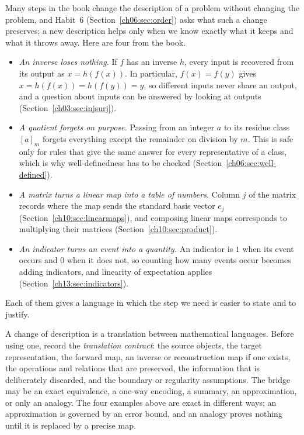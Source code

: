 Many steps in the book change the description of a problem without changing the problem, and Habit~6 (Section~\ref{ch06:sec:order}) asks what such a change preserves; a new description helps only when we know exactly what it keeps and what it throws away. Here are four from the book.
\begin{itemize}
\item \emph{An inverse loses nothing.} If $f$ has an inverse $h$, every input is recovered from its output as $x=h(f(x))$. In particular, $f(x)=f(y)$ gives $x=h(f(x))=h(f(y))=y$, so different inputs never share an output, and a question about inputs can be answered by looking at outputs (Section~\ref{ch03:sec:injsurj}).
\item \emph{A quotient forgets on purpose.} Passing from an integer $a$ to its residue class $[a]_m$ forgets everything except the remainder on division by $m$. This is safe only for rules that give the same answer for every representative of a class, which is why well-definedness has to be checked (Section~\ref{ch06:sec:well-defined}).
\item \emph{A matrix turns a linear map into a table of numbers.} Column $j$ of the matrix records where the map sends the standard basis vector $e_j$ (Section~\ref{ch10:sec:linearmaps}), and composing linear maps corresponds to multiplying their matrices (Section~\ref{ch10:sec:product}).
\item \emph{An indicator turns an event into a quantity.} An indicator is $1$ when its event occurs and $0$ when it does not, so counting how many events occur becomes adding indicators, and linearity of expectation applies (Section~\ref{ch13:sec:indicators}).
\end{itemize}
Each of them gives a language in which the step we need is easier to state and to justify.

A change of description is a translation between mathematical languages. Before using one, record the \emph{translation contract}: the source objects, the target representation, the forward map, an inverse or reconstruction map if one exists, the operations and relations that are preserved, the information that is deliberately discarded, and the boundary or regularity assumptions. The bridge may be an exact equivalence, a one-way encoding, a summary, an approximation, or only an analogy. The four examples above are exact in different ways; an approximation is governed by an error bound, and an analogy proves nothing until it is replaced by a precise map.
